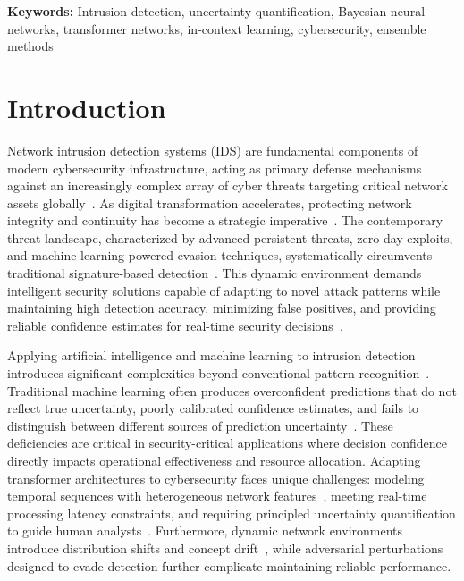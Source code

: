 \documentclass[journal]{IEEEtran}
\begin{document}
\textbf{Keywords:} Intrusion detection, uncertainty quantification, Bayesian neural networks, transformer networks, in-context learning, cybersecurity, ensemble methods

\section{Introduction}

Network intrusion detection systems (IDS) are fundamental components of modern cybersecurity infrastructure, acting as primary defense mechanisms against an increasingly complex array of cyber threats targeting critical network assets globally~\cite{buczak2016survey}. As digital transformation accelerates, protecting network integrity and continuity has become a strategic imperative~\cite{khraisat2019survey}. The contemporary threat landscape, characterized by advanced persistent threats, zero-day exploits, and machine learning-powered evasion techniques, systematically circumvents traditional signature-based detection~\cite{apruzzese2018addressing}. This dynamic environment demands intelligent security solutions capable of adapting to novel attack patterns while maintaining high detection accuracy, minimizing false positives, and providing reliable confidence estimates for real-time security decisions~\cite{ring2019survey}.

Applying artificial intelligence and machine learning to intrusion detection introduces significant complexities beyond conventional pattern recognition~\cite{xin2018machine}. Traditional machine learning often produces overconfident predictions that do not reflect true uncertainty, poorly calibrated confidence estimates, and fails to distinguish between different sources of prediction uncertainty~\cite{kendall2017uncertainties}. These deficiencies are critical in security-critical applications where decision confidence directly impacts operational effectiveness and resource allocation. Adapting transformer architectures to cybersecurity faces unique challenges: modeling temporal sequences with heterogeneous network features~\cite{vaswani2017attention}, meeting real-time processing latency constraints, and requiring principled uncertainty quantification to guide human analysts~\cite{gal2016dropout}. Furthermore, dynamic network environments introduce distribution shifts and concept drift~\cite{quinonero2009dataset}, while adversarial perturbations~\cite{biggio2013evasion} designed to evade detection further complicate maintaining reliable performance.
\end{document}

